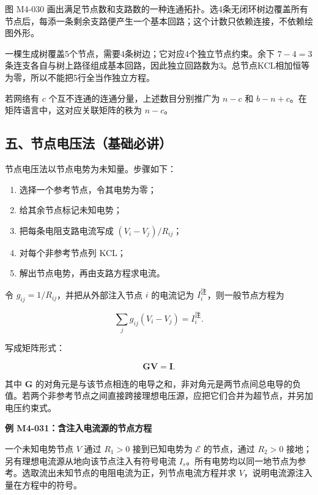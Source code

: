 图 M4-030
画出满足节点数和支路数的一种连通拓扑。选4条无闭环树边覆盖所有节点后，每添一条剩余支路便产生一个基本回路；这个计数只依赖连接，不依赖绘图外形。

一棵生成树覆盖5个节点，需要4条树边；它对应4个独立节点约束。余下
\(7-4=3\)
条连支各自与树上路径组成基本回路，因此独立回路数为3。总节点KCL相加恒等为零，所以不能把5行全当作独立方程。

若网络有 \(c\) 个互不连通的连通分量，上述数目分别推广为 \(n-c\) 和
\(b-n+c\)。在矩阵语言中，这对应关联矩阵的秩为 \(n-c\)。

\subsection{五、节点电压法（基础必讲）}\label{m4:ux4e94ux8282ux70b9ux7535ux538bux6cd5ux57faux7840ux5fc5ux8bb2}

节点电压法以节点电势为未知量。步骤如下：

\begin{enumerate}
\def\labelenumi{\arabic{enumi}.}
\tightlist
\item
  选择一个参考节点，令其电势为零；
\item
  给其余节点标记未知电势；
\item
  把每条电阻支路电流写成 \((V_i-V_j)/R_{ij}\)；
\item
  对每个非参考节点列 KCL；
\item
  解出节点电势，再由支路方程求电流。
\end{enumerate}

令 \(g_{ij}=1/R_{ij}\)，并把从外部注入节点 \(i\) 的电流记为
\(I_i^{\text{注}}\)，则一般节点方程为

\[
\boxed{
\sum_j g_{ij}(V_i-V_j)=I_i^{\text{注}}
}.
\]

写成矩阵形式：

\[
\boxed{
\mathbf G\mathbf V=\mathbf I
}.
\]

其中 \(\mathbf G\)
的对角元是与该节点相连的电导之和，非对角元是两节点间总电导的负值。若两个非参考节点之间直接跨接理想电压源，应把它们合并为超节点，并另加电压约束式。

\par{}
\noindent\begin{minipage}{\linewidth}

\textbf{例 M4-031：含注入电流源的节点方程}

一个未知电势节点 \(V\) 通过 \(R_1>0\) 接到已知电势为 \(\mathcal E\)
的节点，通过 \(R_2>0\) 接地；另有理想电流源从地向该节点注入有符号电流
\(I_s\)。所有电势均以同一地节点为参考。选取流出未知节点的电阻电流为正，列节点电流方程并求
\(V\)，说明电流源注入量在方程中的符号。

\end{minipage}\par

